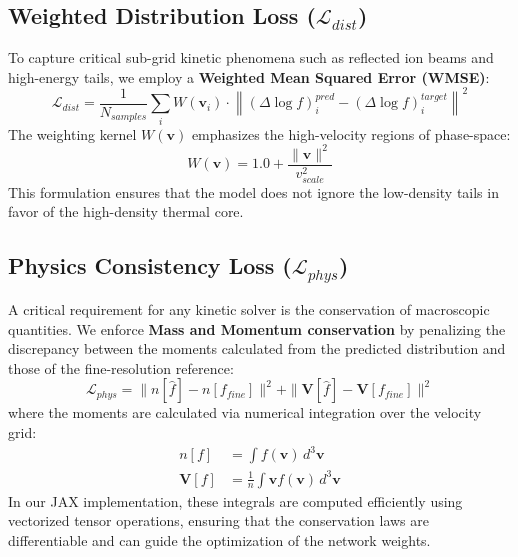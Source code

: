 \documentclass[11pt]{article}
\begin{document}
\subsection{Weighted Distribution Loss ($\mathcal{L}_{dist}$)}
To capture critical sub-grid kinetic phenomena such as reflected ion beams and high-energy tails, we employ a \textbf{Weighted Mean Squared Error (WMSE)}:
\begin{equation}
    \mathcal{L}_{dist} = \frac{1}{N_{samples}} \sum_{i} W(\mathbf{v}_i) \cdot \left\| (\Delta \log f)_{i}^{pred} - (\Delta \log f)_{i}^{target} \right\|^2
\end{equation}
The weighting kernel $W(\mathbf{v})$ emphasizes the high-velocity regions of phase-space:
\begin{equation}
    W(\mathbf{v}) = 1.0 + \frac{\|\mathbf{v}\|^2}{v_{scale}^2}
\end{equation}
This formulation ensures that the model does not ignore the low-density tails in favor of the high-density thermal core.

\subsection{Physics Consistency Loss ($\mathcal{L}_{phys}$)}
A critical requirement for any kinetic solver is the conservation of macroscopic quantities. We enforce \textbf{Mass and Momentum conservation} by penalizing the discrepancy between the moments calculated from the predicted distribution and those of the fine-resolution reference:
\begin{equation}
    \mathcal{L}_{phys} = \|n[\hat{f}] - n[f_{fine}]\|^2 + \|\mathbf{V}[\hat{f}] - \mathbf{V}[f_{fine}]\|^2
\end{equation}
where the moments are calculated via numerical integration over the velocity grid:
\begin{align}
    n[f] &= \int f(\mathbf{v}) \, d^3\mathbf{v} \\
    \mathbf{V}[f] &= \frac{1}{n} \int \mathbf{v} f(\mathbf{v}) \, d^3\mathbf{v}
\end{align}
In our JAX implementation, these integrals are computed efficiently using vectorized tensor operations, ensuring that the conservation laws are differentiable and can guide the optimization of the network weights.
\end{document}
